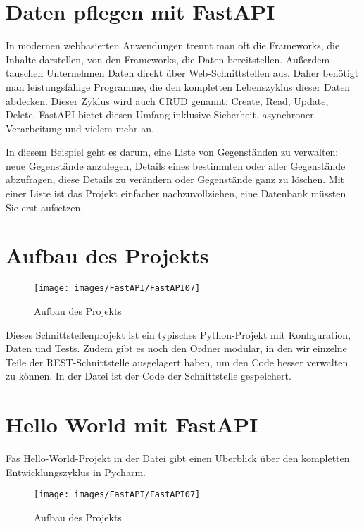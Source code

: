 \section{Daten pflegen mit FastAPI}

In modernen webbasierten Anwendungen trennt man oft die Frameworks, die Inhalte darstellen, von den Frameworks, die Daten bereitstellen. Außerdem tauschen Unternehmen Daten direkt über Web-Schnittstellen aus. Daher benötigt man leistungsfähige Programme, die den kompletten Lebenszyklus dieser Daten abdecken. Dieser Zyklus wird auch CRUD genannt: Create, Read, Update, Delete. FastAPI bietet diesen Umfang inklusive Sicherheit, asynchroner Verarbeitung und vielem mehr an.

In diesem Beispiel geht es darum, eine Liste von Gegenständen zu verwalten: neue Gegenstände anzulegen, Details eines bestimmten oder aller Gegenstände abzufragen, diese Details zu verändern oder Gegenstände ganz zu löschen. Mit einer Liste ist das Projekt einfacher nachzuvollziehen, eine Datenbank müssten Sie erst aufsetzen.

\section{Aufbau des Projekts}

\begin{figure}
    \texttt{[image: images/FastAPI/FastAPI07]}
    \caption{Aufbau des Projekts} \label{FastAPI07}
\end{figure}

Dieses Schnittstellenprojekt ist ein typisches Python-Projekt mit Konfiguration, Daten und Tests. Zudem gibt es noch den Ordner modular, in den wir einzelne Teile der REST-Schnittstelle ausgelagert haben, um den Code besser verwalten zu können. In der Datei  ist der Code der Schnittstelle gespeichert.

\section{Hello World mit FastAPI}

Fas Hello-World-Projekt in der Datei  gibt einen Überblick über den kompletten Entwicklungszyklus in Pycharm.

\begin{figure}
    \texttt{[image: images/FastAPI/FastAPI07]}
    \caption{Aufbau des Projekts} \label{FastAPI07}
\end{figure}


